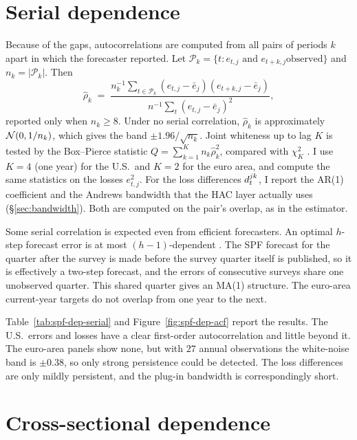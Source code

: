 \begin{appendix}
\tabSpfDepPanels
\figSpfDepErrors

\section{Serial dependence}
\label{app:spf-dep-serial}

Because of the gaps, autocorrelations are computed from all pairs of periods $k$ apart in
which the forecaster reported. Let $\mathcal{P}_k=\{t: e_{t,j}\text{ and }e_{t+k,j}\text{
observed}\}$ and $n_k=|\mathcal{P}_k|$. Then
\begin{equation}
  \hat\rho_k \;=\; \frac{n_k^{-1}\sum_{t\in\mathcal{P}_k}(e_{t,j}-\bar e_j)(e_{t+k,j}-\bar e_j)}
                     {n^{-1}\sum_{t}(e_{t,j}-\bar e_j)^2},
\end{equation}
reported only when $n_k\ge 8$. Under no serial correlation, $\hat\rho_k$ is approximately
$\mathcal{N}(0,1/n_k)$, which gives the band $\pm1.96/\sqrt{n_k}$. Joint whiteness up to lag
$K$ is tested by the Box--Pierce statistic $Q=\sum_{k=1}^K n_k\hat\rho_k^2$, compared with
$\chi^2_K$ \citep{boxpierce1970}. I use $K=4$ (one year) for the U.S.\ and $K=2$ for the
euro area, and compute the same statistics on the losses $e_{t,j}^2$. For the loss
differences $d^{jk}_t$, I report the AR(1) coefficient and the Andrews bandwidth that
the HAC layer actually uses (\S\ref{sec:bandwidth}). Both are computed on the pair's
overlap, as in the estimator.

Some serial correlation is expected even from efficient forecasters. An optimal $h$-step
forecast error is at most $(h-1)$-dependent \citep{dieboldmariano1995}. The SPF forecast
for the quarter after the survey is made before the survey quarter itself is published,
so it is effectively a two-step forecast, and the errors of consecutive surveys share one
unobserved quarter. This shared quarter gives an MA(1) structure. The euro-area current-year targets do not
overlap from one year to the next.

Table~\ref{tab:spf-dep-serial} and Figure~\ref{fig:spf-dep-acf} report the results. The
U.S.\ errors and losses have a clear first-order autocorrelation and little beyond it. The
euro-area panels show none, but with $27$ annual observations the white-noise band is
$\pm0.38$, so only strong persistence could be detected. The loss differences are only
mildly persistent, and the plug-in bandwidth is correspondingly short.

\tabSpfDepSerial
\figSpfDepAcf

\section{Cross-sectional dependence}
\label{app:spf-dep-cross}


\end{appendix}
